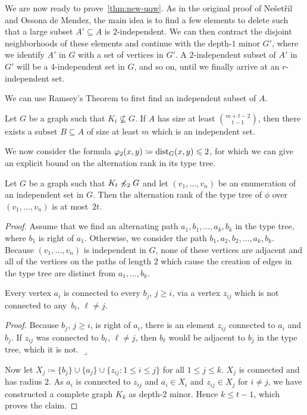We are now ready to prove~\cref{thm:new-uqw}. As in the 
original proof of Ne\v{s}et\v{r}il and Ossona de Mendez, the main 
idea is to find a few elements to delete such that a large
subset $A'\subseteq A$ is $2$-independent. We can then 
contract the disjoint neighborhoods of these elements and
continue with the depth-$1$ minor $G'$, where we 
identify $A'$ in $G$ with a set of vertices in $G'$. A $2$-independent
subset of $A'$ in $G'$ will be a $4$-independent set in $G$, 
and so on, until we finally arrive at an $r$-independent set. 

We can use Ramsey's Theorem to first find an independent subset
of $A$. 

\begin{lemma}
Let $G$ be a graph such that $K_t\not\subseteq G$. If $A$
has size at least $\binom{m+t-2}{t-1}$, then there exists
a subset $B\subseteq A$ of size at least $m$ which is an
independent set. 
\end{lemma}

We now consider the formula 
$\varphi_2(x,y)\coloneqq \mathrm{dist}_G(x,y)\leqslant 2$, for which we can give an explicit 
bound on the alternation rank in its type tree. 

\begin{theorem}\label{thm:alternation-rank-type-tree}
Let $G$ be a graph such that $K_t\not\preccurlyeq_2G$ and let
$(v_1,\ldots, v_n)$ be an enumeration of an independent set 
in $G$. Then the alternation rank of the type tree of $\phi$ 
over $(v_1,\ldots, v_n)$ is at most~$2t$. 
\end{theorem}
\begin{proof}
Assume that we find an alternating path $a_1,b_1,\ldots, a_k,b_k$ 
in the type tree, where $b_1$ is right of $a_1$. Otherwise, we consider
the path $b_1,a_2,b_2,\ldots,a_k, b_k$. Because $(v_1,\ldots, v_n)$ is independent in $G$, 
none of these vertices are adjacent and all of the vertices on the
paths of length $2$ which cause the creation of edges in the type
tree are distinct from $a_1,\ldots, b_k$. 

\begin{claim}
Every vertex $a_i$ is connected to every $b_j$, $j\geq i$,
via a vertex $z_{ij}$ which is not connected to any~$b_\ell$, $\ell\neq j$. 
\end{claim}

\noindent\textit{Proof.} Because $b_j$, $j\geq i$, is right of $a_i$, there is 
an element $z_{ij}$ connected to $a_i$ and $b_j$. If $z_{ij}$ was 
connected to $b_\ell$, $\ell\neq j$, then $b_\ell$ would be adjacent 
to $b_j$ in the type tree, which it is not. \hfill$\lrcorner$

\bigskip
Now let $X_j\coloneqq \{b_j\}\cup\{a_j\}\cup\{z_{ij} : 1\leq i\leq j\}$
for all $1\leq j\leq k$. $X_j$ is connected and has radius $2$. As $a_i$
is connected to $z_{ij}$ and $a_i\in X_i$ and $z_{ij}\in X_j$ for $i\neq j$, 
we have constructed a complete graph $K_k$ as depth-$2$ minor. Hence 
$k\leq t-1$, which proves the claim. 
\end{proof}

